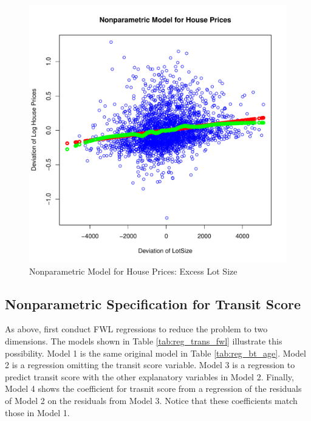 \begin{figure}[h!]
  \centering
  \includegraphics[scale = 0.5, keepaspectratio=true]{../Figures/dev_np_vs_lot_dev}
  \caption{Nonparametric Model for House Prices: Excess Lot Size} \label{fig:dev_np_vs_lot_dev}
\end{figure}





\clearpage
\subsection{Nonparametric Specification for Transit Score}

As above, first conduct FWL regressions 
to reduce the problem to two dimensions. 
The models shown in
Table \ref{tab:reg_trans_fwl}
illustrate this possibility. 
Model 1 is the same original model in 
Table \ref{tab:reg_bt_age}. 
Model 2 is a regression omitting the transit score variable. 
Model 3 is a regression to predict transit score with the other explanatory variables in Model 2.
Finally, Model 4 shows the coefficient for trasnit score
from a regression of the residuals of Model 2
on the residuals from Model 3. 
Notice that these coefficients match those in Model 1. 



